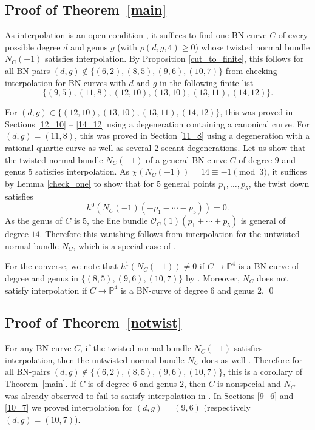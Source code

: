 \documentclass[11pt]{amsart}
\newcommand{\pp}{\mathbb{P}}
\renewcommand{\O}{\mathcal{O}}
\theoremstyle{definition}
\theoremstyle{remark}
\begin{document}
\subsection{Proof of Theorem~\ref{main}}

As interpolation is an open condition \cite[Theorem 5.8]{nasko}, it suffices to find one BN-curve $C$ of every possible degree $d$ and genus $g$ (with $\rho(d,g,4) \geq 0$) whose twisted normal bundle $N_C(-1)$ satisfies interpolation.  By Proposition \ref{cut_to_finite}, this follows for all BN-pairs $(d,g) \notin \{(6,2), (8,5), (9,6), (10,7)\}$ from checking interpolation for BN-curves with $d$ and $g$ in the following finite list
\[\{(9,5), (11,8), (12,10), (13,10), (13,11), (14,12)\}. \]

For $(d,g) \in \{(12,10), (13,10), (13,11), (14,12)\}$, this was proved in Sections \ref{12_10} -- \ref{14_12} using a degeneration containing a canonical curve.  For $(d,g) = (11,8)$, this was proved in Section \ref{11_8} using a degeneration with a rational quartic curve as well as several 2-secant degenerations.  Let us show that the twisted normal bundle $N_C(-1)$ of a general BN-curve $C$ of degree $9$ and genus $5$ satisfies interpolation.  As $\chi(N_C(-1)) = 14 \equiv -1 \pmod{3}$, it suffices by Lemma \ref{check_one} to show that for $5$ general points $p_1, \ldots, p_5$, the twist down satisfies
\[h^0(N_C(-1)(-p_1- \cdots -p_5)) = 0. \]
As the genus of $C$ is $5$, the line bundle $\O_C(1)(p_1 +\cdots +p_5)$ is general of degree $14$.  Therefore this vanishing follows from interpolation for the untwisted normal bundle $N_C$, which is a special case of
\cite[Theorem 1.3]{joint}.

For the converse, we note that $h^1(N_C(-1)) \neq 0$
if $C \to \pp^4$ is a BN-curve of degree and genus in $\{(8, 5), (9, 6), (10, 7)\}$
by \cite[Theorem 1.6]{quadrics}.
Moreover, $N_C$ does not satisfy interpolation
if $C \to \pp^4$ is a BN-curve of degree $6$ and genus $2$.
\qed

\subsection{Proof of Theorem~\ref{notwist}}

For any BN-curve $C$, if the twisted normal bundle $N_C(-1)$ satisfies interpolation, then the untwisted normal bundle $N_C$ does as well \cite[Proposition 4.11]{joint}.  Therefore for all BN-pairs $(d,g) \notin \{(6,2), (8,5), (9,6), (10,7)\}$, this is a corollary of Theorem~\ref{main}.  If $C$ is of degree $6$ and genus $2$, then $C$ is nonspecial and $N_C$ was already observed to fail to satisfy interpolation in \cite{joint}.  In Sections \ref{9_6} and \ref{10_7} we proved interpolation for $(d,g) = (9,6)$ (respectively $(d,g) =(10,7)$). 
\end{document}
